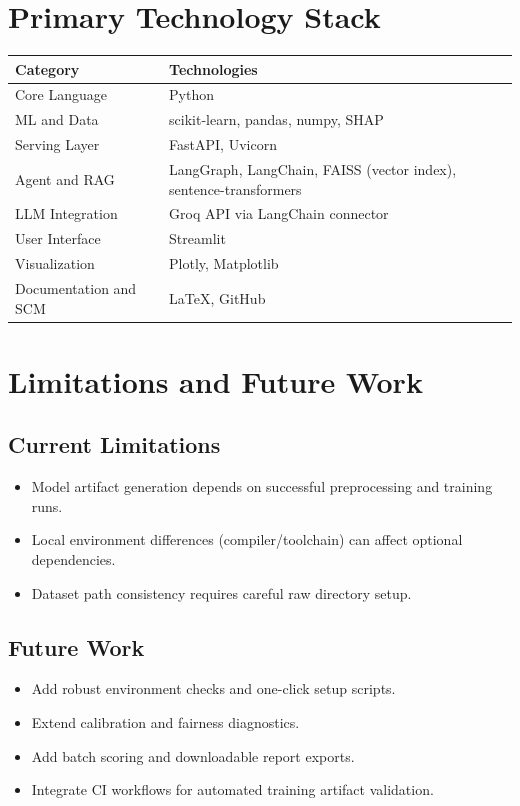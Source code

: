 \documentclass[12pt,a4paper]{article}
\begin{document}
\section{Primary Technology Stack}
\begin{longtable}{>{\raggedright\arraybackslash}p{}p{}}
\toprule
Category & Technologies \\
\midrule
Core Language & Python \\
ML and Data & scikit-learn, pandas, numpy, SHAP \\
Serving Layer & FastAPI, Uvicorn \\
Agent and RAG & LangGraph, LangChain, FAISS (vector index), sentence-transformers \\
LLM Integration & Groq API via LangChain connector \\
User Interface & Streamlit \\
Visualization & Plotly, Matplotlib \\
Documentation and SCM & LaTeX, GitHub \\
\bottomrule
\end{longtable}

\section{Limitations and Future Work}
\subsection{Current Limitations}
\begin{itemize}[leftmargin=1.5em]
  \item Model artifact generation depends on successful preprocessing and training runs.
  \item Local environment differences (compiler/toolchain) can affect optional dependencies.
  \item Dataset path consistency requires careful raw directory setup.
\end{itemize}

\subsection{Future Work}
\begin{itemize}[leftmargin=1.5em]
  \item Add robust environment checks and one-click setup scripts.
  \item Extend calibration and fairness diagnostics.
  \item Add batch scoring and downloadable report exports.
  \item Integrate CI workflows for automated training artifact validation.
\end{itemize}
\end{document}
